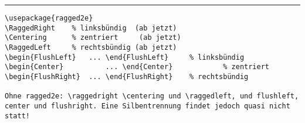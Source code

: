 \hrule \vspace{0.5\baselineskip}
%
%
\begin{lstlisting}
\usepackage{ragged2e}
\RaggedRight	% linksbündig  (ab jetzt)
\Centering		% zentriert     (ab jetzt)
\RaggedLeft		% rechtsbündig (ab jetzt)
\begin{FlushLeft} 	... \end{FlushLeft}		% linksbündig
\begin{Center} 			... \end{Center}			% zentriert
\begin{FlushRight}	... \end{FlushRight}	% rechtsbündig

Ohne ragged2e: \raggedright \centering und \raggedleft, und flushleft, center und flushright. Eine Silbentrennung findet jedoch quasi nicht statt!
\end{lstlisting}
\negAbstand
